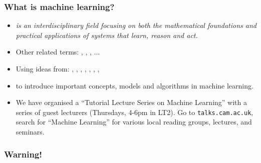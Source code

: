 




\begin{frame}
\frametitle{What is machine learning?}

\begin{itemize}
\item {\it {} is an interdisciplinary field
focusing on both the mathematical foundations and practical
applications of systems that learn, reason and act.}\\[1ex]

\item Other related terms: , , ,  ...

\item Using ideas from: 
, , , 
, ,
, ,

\item {} to introduce important
concepts, models and algorithms in machine learning.

\item {} We have organised a ``Tutorial Lecture Series on
  Machine Learning'' with a series of guest lecturers (Thursdays,
  4-6pm in LT2). Go to
  {\tt talks.cam.ac.uk}, search for ``Machine Learning'' for various local reading
  groups, lectures, and seminars.

\end{itemize}
\end{frame}

\begin{frame}
\frametitle{Warning!}

\vspace{0.5in}

\centerline{}

\end{frame}



